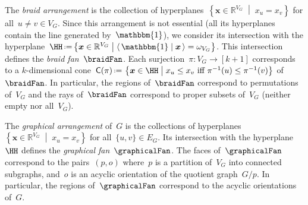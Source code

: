 \documentclass{amsart}
\theoremstyle{definition}
\newcommand{\R}{\mathbb{R}} %
\renewcommand{\b}[1]{{\boldsymbol{#1}}} %
\newcommand{\set}[2]{\left\{ #1 \;\middle|\; #2 \right\}} %
\newcommand{\bigset}[2]{\big\{ #1 \;\big|\; #2 \big\}} %
\newcommand{\dotprod}[2]{\langle \, #1 \; | \; #2 \, \rangle} %
\newcommand{\one}{\mathbbm{1}} %
\newcommand{\eqdef}{\mbox{\,\raisebox{0.2ex}{\scriptsize\ensuremath{\mathrm:}}\ensuremath{=}\,}} %
\DeclareMathOperator{\cone}{cone} %
\newcommand{\darkblue}{\color{darkblue}} %
\newcommand{\defn}[1]{\textsl{\darkblue #1}} %
\newcommand{\primalCone}{\mathsf{C}^\star} %
\newcommand{\normalCone}{\mathsf{C}} %
\newcommand{\weight}{\omega} %
\begin{document}
The \defn{braid arrangement} is the collection of hyperplanes~$\set{\b{x} \in \R^{V_G}}{x_u = x_v}$ for all~$u \ne v \in V_G$.
Since this arrangement is not essential (all its hyperplanes contain the line generated by~$\one$), we consider its intersection with the hyperplane~$\HH \eqdef \bigset{\b{x} \in \R^{V_G}}{\dotprod{\one}{\b{x}} = \weight_{V_G}}$.
This intersection defines the \defn{braid fan}~$\braidFan$.
Each surjection~$\pi : V_G \to [k+1]$ corresponds to a $k$-dimensional cone~$\normalCone(\pi) \eqdef \set{\b{x} \in \HH}{x_u \le x_v \text{ iff } \pi^{-1}(u) \le \pi^{-1}(v)}$ of~$\braidFan$.
In particular, the regions of~$\braidFan$ correspond to permutations of~$V_G$ and the rays of~$\braidFan$ correspond to proper subsets of~$V_G$ (neither empty nor all~$V_G$).

The \defn{graphical arrangement} of~$G$ is the collections of hyperplanes~$\set{\b{x} \in \R^{V_G}}{x_u = x_v}$ for all~$\{u,v\} \in E_G$.
Its intersection with the hyperplane~$\HH$ defines the \defn{graphical fan}~$\graphicalFan$.
The faces of~$\graphicalFan$ correspond to the pairs~$(p,o)$ where~$p$ is a partition of~$V_G$ into connected subgraphs, and~$o$ is an acyclic orientation of the quotient graph~$G/p$.
In particular, the regions of~$\graphicalFan$ correspond to the acyclic orientations of~$G$.
\end{document}
